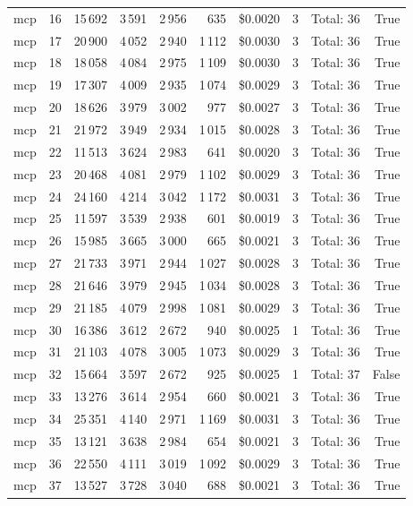 \documentclass[a4paper,11pt]{article}
\begin{document}
\begin{table}[H]
{\begin{tabular}{l r r r r r r r l r}
mcp & 16 & 15\,692 & 3\,591 & 2\,956 & 635 & \$0.0020 & 3 & Total: 36 & True \\
mcp & 17 & 20\,900 & 4\,052 & 2\,940 & 1\,112 & \$0.0030 & 3 & Total: 36 & True \\
mcp & 18 & 18\,058 & 4\,084 & 2\,975 & 1\,109 & \$0.0030 & 3 & Total: 36 & True \\
mcp & 19 & 17\,307 & 4\,009 & 2\,935 & 1\,074 & \$0.0029 & 3 & Total: 36 & True \\
mcp & 20 & 18\,626 & 3\,979 & 3\,002 & 977 & \$0.0027 & 3 & Total: 36 & True \\
mcp & 21 & 21\,972 & 3\,949 & 2\,934 & 1\,015 & \$0.0028 & 3 & Total: 36 & True \\
mcp & 22 & 11\,513 & 3\,624 & 2\,983 & 641 & \$0.0020 & 3 & Total: 36 & True \\
mcp & 23 & 20\,468 & 4\,081 & 2\,979 & 1\,102 & \$0.0029 & 3 & Total: 36 & True \\
mcp & 24 & 24\,160 & 4\,214 & 3\,042 & 1\,172 & \$0.0031 & 3 & Total: 36 & True \\
mcp & 25 & 11\,597 & 3\,539 & 2\,938 & 601 & \$0.0019 & 3 & Total: 36 & True \\
mcp & 26 & 15\,985 & 3\,665 & 3\,000 & 665 & \$0.0021 & 3 & Total: 36 & True \\
mcp & 27 & 21\,733 & 3\,971 & 2\,944 & 1\,027 & \$0.0028 & 3 & Total: 36 & True \\
mcp & 28 & 21\,646 & 3\,979 & 2\,945 & 1\,034 & \$0.0028 & 3 & Total: 36 & True \\
mcp & 29 & 21\,185 & 4\,079 & 2\,998 & 1\,081 & \$0.0029 & 3 & Total: 36 & True \\
mcp & 30 & 16\,386 & 3\,612 & 2\,672 & 940 & \$0.0025 & 1 & Total: 36 & True \\
mcp & 31 & 21\,103 & 4\,078 & 3\,005 & 1\,073 & \$0.0029 & 3 & Total: 36 & True \\
mcp & 32 & 15\,664 & 3\,597 & 2\,672 & 925 & \$0.0025 & 1 & Total: 37 & False \\
mcp & 33 & 13\,276 & 3\,614 & 2\,954 & 660 & \$0.0021 & 3 & Total: 36 & True \\
mcp & 34 & 25\,351 & 4\,140 & 2\,971 & 1\,169 & \$0.0031 & 3 & Total: 36 & True \\
mcp & 35 & 13\,121 & 3\,638 & 2\,984 & 654 & \$0.0021 & 3 & Total: 36 & True \\
mcp & 36 & 22\,550 & 4\,111 & 3\,019 & 1\,092 & \$0.0029 & 3 & Total: 36 & True \\
mcp & 37 & 13\,527 & 3\,728 & 3\,040 & 688 & \$0.0021 & 3 & Total: 36 & True \\

\end{tabular}}
\end{table}
\end{document}
